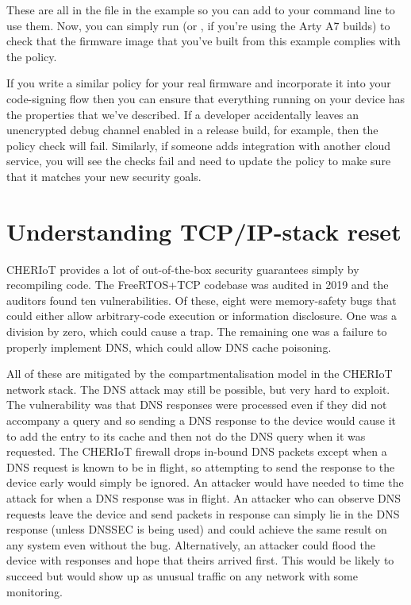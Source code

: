 {\regolisting[filename=examples/mqtt/mqtt.rego,marker=send_restrictions,label=lst:regomqttsend_restrictions,caption="Rego rules to ensure that no data leaves the device unencrypted for the MQTT example."]{}

These are all in the  file in the example so you can add  to your  command line to use them.
Now, you can simply run  (or , if you're using the Arty A7 builds) to check that the firmware image that you've built from this example complies with the policy.

If you write a similar policy for your real firmware and incorporate it into your code-signing flow then you can ensure that everything running on your device has the properties that we've described.
If a developer accidentally leaves an unencrypted debug channel enabled in a release build, for example, then the policy check will fail.
Similarly, if someone adds integration with another cloud service, you will see the checks fail and need to update the policy to make sure that it matches your new security goals.

\section[label=netreset]{Understanding TCP/IP-stack reset}

CHERIoT provides a lot of out-of-the-box security guarantees simply by recompiling code.
The FreeRTOS+TCP codebase was audited in 2019 and the auditors found ten vulnerabilities.
Of these, eight were memory-safety bugs that could either allow arbitrary-code execution or information disclosure.
One was a division by zero, which could cause a trap.
The remaining one was a failure to properly implement DNS, which could allow DNS cache poisoning.

All of these are mitigated by the compartmentalisation model in the CHERIoT network stack.
The DNS attack may still be possible, but very hard to exploit.
The vulnerability was that DNS responses were processed even if they did not accompany a query and so sending a DNS response to the device would cause it to add the entry to its cache and then not do the DNS query when it was requested.
The CHERIoT firewall drops in-bound DNS packets except when a DNS request is known to be in flight, so attempting to send the response to the device early would simply be ignored.
An attacker would have needed to time the attack for when a DNS response was in flight.
An attacker who can observe DNS requests leave the device and send packets in response can simply lie in the DNS response (unless DNSSEC is being used) and could achieve the same result on any system even without the bug.
Alternatively, an attacker could flood the device with responses and hope that theirs arrived first.
This would be likely to succeed but would show up as unusual traffic on any network with some monitoring.

}
